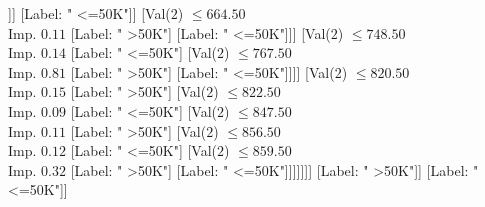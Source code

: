 \documentclass[margin=10pt]{standalone}
\begin{document}
\begin{forest}
																		[Val($2$) $ \leq 885.50$ \\ Imp. $0.02$
																			[Val($2$) $ \leq 878.50$ \\ Imp. $0.03$
																				[Val($2$) $ \leq 874.50$ \\ Imp. $0.03$
																					[Val($2$) $ \leq 873.50$ \\ Imp. $0.03$
																						[Val($2$) $ \leq 778.50$ \\ Imp. $0.02$
																							[Val($2$) $ \leq 699.50$ \\ Imp. $0.05$
																								[Val($2$) $ \leq 663.50$ \\ Imp. $0.04$
																									[Val($2$) $ \leq 654.50$ \\ Imp. $0.08$
																										[Val($2$) $ \leq 620.50$ \\ Imp. $0.05$
																											[Label: " <=50K"]
																											[Val($2$) $ \leq 623.50$ \\ Imp. $0.14$
																												[Label: " >50K"]
																												[Label: " <=50K"]]]
																										[Label: " <=50K"]]
																									[Val($2$) $ \leq 664.50$ \\ Imp. $0.11$
																										[Label: " >50K"]
																										[Label: " <=50K"]]]
																								[Val($2$) $ \leq 748.50$ \\ Imp. $0.14$
																									[Label: " <=50K"]
																									[Val($2$) $ \leq 767.50$ \\ Imp. $0.81$
																										[Label: " >50K"]
																										[Label: " <=50K"]]]]
																							[Val($2$) $ \leq 820.50$ \\ Imp. $0.15$
																								[Label: " >50K"]
																								[Val($2$) $ \leq 822.50$ \\ Imp. $0.09$
																									[Label: " <=50K"]
																									[Val($2$) $ \leq 847.50$ \\ Imp. $0.11$
																										[Label: " >50K"]
																										[Val($2$) $ \leq 856.50$ \\ Imp. $0.12$
																											[Label: " <=50K"]
																											[Val($2$) $ \leq 859.50$ \\ Imp. $0.32$
																												[Label: " >50K"]
																												[Label: " <=50K"]]]]]]]
																						[Label: " >50K"]]
																					[Label: " <=50K"]]

\end{forest}
\end{document}
